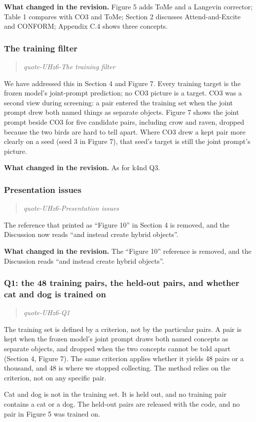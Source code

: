\documentclass[11pt]{article}
\def\showquotes{}        %
\newcommand{\reviewquote}[2]{\ifdefined\showquotes\begin{quote}\color{rev}\itshape\csname quote-#1-#2\endcsname\end{quote}\fi}
\newcommand{\changed}[1]{\par{\color{chg}\textbf{What changed in the revision.}} #1\par}
\begin{document}
\changed{Figure 5 adds ToMe and a Langevin corrector; Table 1 compares with CO3 and ToMe; Section 2 discusses Attend-and-Excite and CONFORM; Appendix C.4 shows three concepts.}

\subsubsection*{The training filter}
\reviewquote{UHz6}{The training filter}

We have addressed this in Section 4 and Figure 7. Every training target is the frozen model's joint-prompt prediction; no CO3 picture is a target. CO3 was a second view during screening: a pair entered the training set when the joint prompt drew both named things as separate objects. Figure 7 shows the joint prompt beside CO3 for five candidate pairs, including crow and raven, dropped because the two birds are hard to tell apart. Where CO3 drew a kept pair more clearly on a seed (seed 3 in Figure 7), that seed's target is still the joint prompt's picture.

\changed{As for k4nd Q3.}

\subsubsection*{Presentation issues}
\reviewquote{UHz6}{Presentation issues}

The reference that printed as ``Figure 10'' in Section 4 is removed, and the Discussion now reads ``and instead create hybrid objects''.

\changed{The ``Figure 10'' reference is removed, and the Discussion reads ``and instead create hybrid objects''.}

\subsubsection*{Q1: the 48 training pairs, the held-out pairs, and whether cat and dog is trained on}
\reviewquote{UHz6}{Q1}

The training set is defined by a criterion, not by the particular pairs. A pair is kept when the frozen model's joint prompt draws both named concepts as separate objects, and dropped when the two concepts cannot be told apart (Section 4, Figure 7). The same criterion applies whether it yields 48 pairs or a thousand, and 48 is where we stopped collecting. The method relies on the criterion, not on any specific pair.

Cat and dog is not in the training set. It is held out, and no training pair contains a cat or a dog. The held-out pairs are released with the code, and no pair in Figure 5 was trained on.
\end{document}
